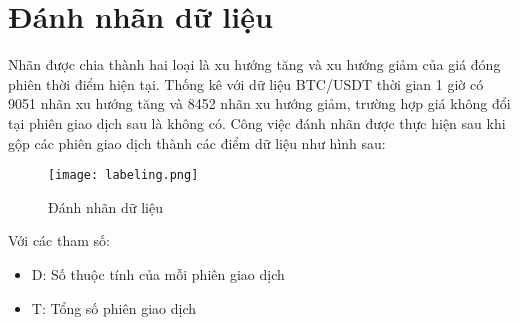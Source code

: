 \section{Đánh nhãn dữ liệu} \label{data-labeling}
Nhãn được chia thành hai loại là xu hướng tăng và xu hướng giảm của giá đóng phiên thời điểm hiện tại. Thống kê với dữ liệu BTC/USDT thời gian 1 giờ có 9051 nhãn xu hướng tăng và 8452 nhãn xu hướng giảm, trường hợp giá không đổi tại phiên giao dịch sau là không có. Công việc đánh nhãn được thực hiện sau khi gộp các phiên giao dịch thành các điểm dữ liệu như hình sau:
\begin{figure}[hbt!]
	\center	\texttt{[image: labeling.png]}
	\caption{Đánh nhãn dữ liệu}
	\label{fig:Labeling}

\end{figure}
Với các tham số:
\begin{itemize}
    \item D: Số thuộc tính của mỗi phiên giao dịch
    \item T: Tổng số phiên giao dịch
\end{itemize}




